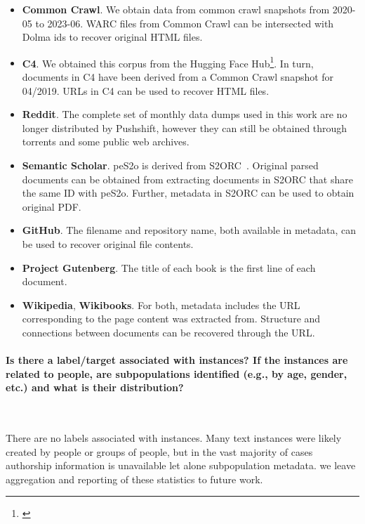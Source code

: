 \documentclass{article}
\newcommand{\dolma}{Dolma\xspace}
\begin{document}
\begin{itemize}[leftmargin=1em]
    \item \textbf{Common Crawl}. We obtain data from common crawl snapshots from 2020-05 to 2023-06. WARC files from Common Crawl can be intersected with \dolma ids to recover original HTML files.
    \item \textbf{C4}. We obtained this corpus from the Hugging Face Hub\footnote{\label{foot:c4}\href{https://huggingface.co/datasets/allenai/c4}{}}. In turn, documents in C4 have been derived from a Common Crawl snapshot for 04/2019. URLs in C4 can be used to recover HTML files.
    \item \textbf{Reddit}. The complete set of monthly data dumps used in this work are no longer distributed by Pushshift, however they can still be obtained through torrents and some public web archives.   
    \item \textbf{Semantic Scholar}. peS2o is derived from S2ORC~\citep{lo-etal-2020-s2orc}. Original parsed documents can be obtained from extracting documents in S2ORC that share the same ID with peS2o. Further, metadata in S2ORC can be used to obtain original PDF.
    \item \textbf{GitHub}. The filename and repository name, both available in metadata, can be used to recover original file contents.
    \item \textbf{Project Gutenberg}. The title of each book is the first line of each document.
    \item \textbf{Wikipedia}, \textbf{Wikibooks}. For both, metadata includes the URL corresponding to the page content was extracted from. Structure and connections between documents can be recovered through the URL.
\end{itemize}

\paragraph{Is there a label/target associated with instances? If the instances are related to people, are subpopulations identified (e.g., by age, gender, etc.) and what is their distribution?}~

There are no labels associated with instances. 
Many text instances were likely created by people or groups of people, but in the vast majority of cases authorship information is unavailable let alone subpopulation metadata. we leave aggregation and reporting of these statistics to future work.
\end{document}
